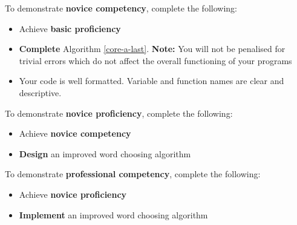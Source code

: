 \documentclass{../../../fal_assignment}
\begin{document}
To demonstrate \textbf{novice competency}, complete the following:
\begin{itemize}
	\item Achieve \textbf{basic proficiency}
	\item \textbf{Complete} Algorithm \ref{core-a-last}. \textbf{Note:} You will not be penalised for trivial errors which do not
affect the overall functioning of your programs
	\item Your code is well formatted. Variable and function names are clear and descriptive.
\end{itemize}

To demonstrate \textbf{novice proficiency}, complete the following:
\begin{itemize}
	\item Achieve \textbf{novice competency}
	\item \textbf{Design} an improved word choosing algorithm 
\end{itemize}

To demonstrate \textbf{professional competency}, complete the following:
\begin{itemize}
	\item Achieve \textbf{novice proficiency}
	\item \textbf{Implement} an improved word choosing algorithm 
\end{itemize}
\end{document}
